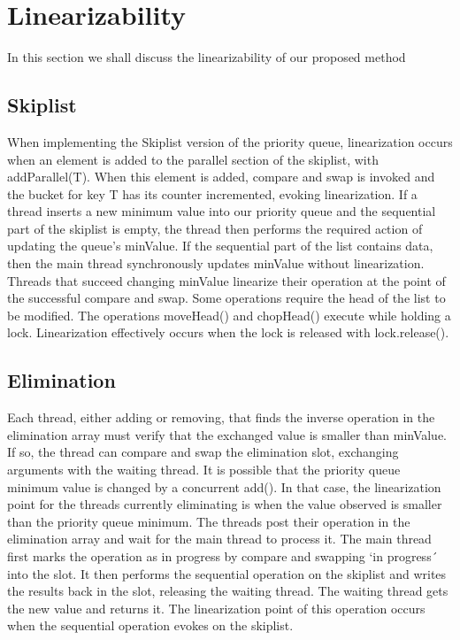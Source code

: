 \documentclass[10pt]{asme2ej}
\begin{document}
\section{Linearizability}

In this section we shall discuss the linearizability of our proposed method

\subsection{Skiplist}

When implementing the Skiplist version of the priority queue, linearization occurs when an element is added to the parallel section of the skiplist, with addParallel(T). When this element is added, compare and swap \cite{cas} is invoked and the bucket for key T has its counter incremented, evoking linearization. If a thread inserts a new minimum value into our priority queue and the sequential part of the skiplist is empty, the thread then performs the required action of updating the queue’s minValue. If the sequential part of the list contains data, then the main thread synchronously updates minValue without linearization. Threads that succeed changing minValue linearize their operation at the point of the successful compare and swap. Some operations require the head of the list to be modified. The operations moveHead() and chopHead() execute while holding a lock. Linearization effectively occurs when the lock is released with lock.release().

\subsection{Elimination}

Each thread, either adding or removing, that finds the inverse operation in the elimination array must verify that the exchanged value is smaller than minValue. If so, the thread can compare and swap the elimination slot, exchanging arguments with the waiting thread. It is possible that the priority queue minimum value is changed by a concurrent add(). In that case, the linearization point for the threads currently eliminating is when the value  observed is smaller than the priority queue minimum. The threads post their operation in the elimination array and wait for the main thread to process it. The main thread first marks the operation as in progress by compare and swapping ‘in progress´ into the slot. It then performs the sequential operation on the skiplist and writes the results back in the slot, releasing the waiting thread. The waiting thread gets the new value and returns it. The linearization point of this operation occurs when the sequential operation evokes on the skiplist.
\end{document}
